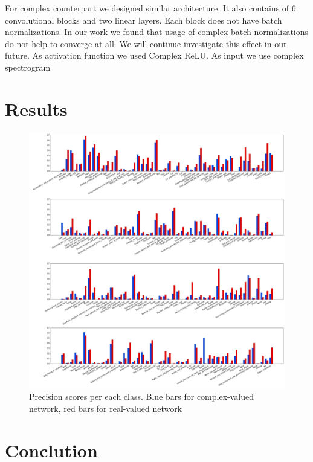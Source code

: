 \documentclass{article}
\begin{document}
For complex counterpart we designed similar architecture. It also contains of 6 convolutional blocks 
and two linear layers. Each block does not have batch normalizations. In our work we found that usage of 
complex batch normalizations \citep{Trabelsi2017} do not help to converge at all. We will continue investigate
 this effect in our future. As activation function we used Complex ReLU\citep{Trabelsi2017}. As input we use complex spectrogram

\section{Results}

\begin{figure}
	\centering
	\includegraphics[width=0.49\linewidth]{assets/AP.jpg}
	\caption{Precision scores per each class. Blue bars for complex-valued network, red bars for real-valued network}
	\label{fig:apperclass}
\end{figure}


\section{Conclution}




\end{document}
